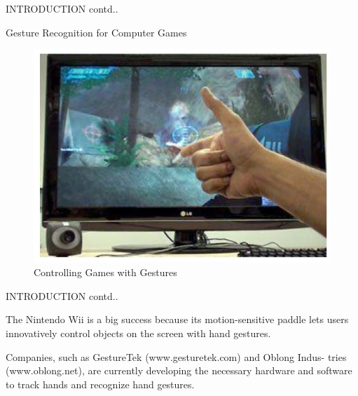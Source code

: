 \documentclass{beamer}
\begin{document}
\begin{frame}{INTRODUCTION contd..}
\begin{block}{Gesture Recognition for Computer Games } 



\begin{figure}
\begin{center}
\includegraphics[scale=0.3]{images/game.jpg}
\caption{Controlling Games with Gestures }
\end{center}
\end{figure}

\end{block}
\end{frame}
\begin{frame}{INTRODUCTION contd..}
\begin{block}{}


The Nintendo Wii is a big success because its motion-sensitive paddle lets users innovatively
control objects on the screen with hand gestures.
\end{block}
  \vspace{0.5cm}
 \begin{block}{}
Companies, such as GestureTek (www.gesturetek.com) and Oblong Indus-
tries (www.oblong.net), are currently developing the necessary hardware and software to track
hands and recognize hand gestures.
\end{block}
 \vspace{0.5cm}

\end{frame}
\end{document}
